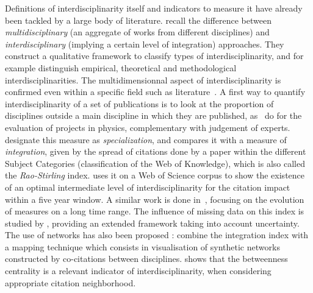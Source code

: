 Definitions of interdisciplinarity itself and indicators to measure it have already been tackled by a large body of literature. \cite{huutoniemi2010analyzing} recall the difference between \emph{multidisciplinary} (an aggregate of works from different disciplines) and \emph{interdisciplinary} (implying a certain level of integration) approaches. They construct a qualitative framework to classify types of interdisciplinarity, and for example distinguish empirical, theoretical and methodological interdisciplinarities. The multidimensionnal aspect of interdisciplinarity is confirmed even within a specific field such as literature~\citep{austin1996defining}. A first way to quantify interdisciplinarity of a set of publications is to look at the proportion of disciplines outside a main discipline in which they are published, as~\cite{rinia2002impact} do for the evaluation of projects in physics, complementary with judgement of experts. \cite{porter2007measuring} designate this measure as \emph{specialization}, and compares it with a measure of \emph{integration}, given by the spread of citations  done by a paper within the different Subject Categories (classification of the Web of Knowledge), which is also called the \emph{Rao-Stirling} index. \cite{lariviere2010relationship} uses it on a Web of Science corpus to show the existence of an optimal intermediate level of interdisciplinarity for the citation impact within a five year window. A similar work is done in~\citep{lariviere201410}, focusing on the evolution of measures on a long time range. The influence of missing data on this index is studied by \cite{moreno2016uncertainty}, providing an extended framework taking into account uncertainty. The use of networks has also been proposed : \cite{porter2009science} combine the integration index with a mapping technique which consists in visualisation of synthetic networks constructed by co-citations between disciplines. \cite{leydesdorff2007betweenness} shows that the betweenness centrality is a relevant indicator of interdisciplinarity, when considering appropriate citation neighborhood.



